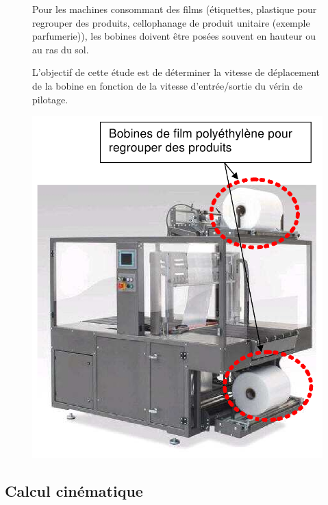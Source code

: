 \begin{figure}[!h]
 \begin{minipage}{0.5\linewidth}
 Pour les machines consommant des films (étiquettes, plastique pour regrouper des produits, cellophanage de produit unitaire (exemple parfumerie)), les bobines doivent être posées souvent en hauteur ou au ras du sol.
 
 L'objectif de cette étude est de déterminer la vitesse de déplacement de la bobine en fonction de la vitesse d'entrée/sortie du vérin de pilotage.
 \end{minipage}
 \hfill
 \begin{minipage}{0.4\linewidth}
  \centering\includegraphics[width=0.9\linewidth]{img/bobine.png}
 \end{minipage}
\end{figure}

\subsection{Calcul cinématique}

